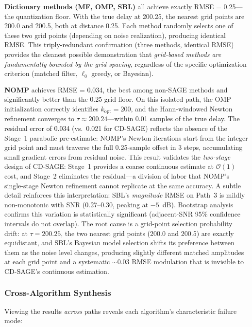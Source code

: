 \documentclass[journal]{IEEEtran}
\begin{document}
\textbf{Dictionary methods (MF, OMP, SBL)} all achieve exactly RMSE = 0.25---the quantization floor. With the true delay at 200.25, the nearest grid points are 200.0 and 200.5, both at distance 0.25. Each method randomly selects one of these two grid points (depending on noise realization), producing identical RMSE. This triply-redundant confirmation (three methods, identical RMSE) provides the cleanest possible demonstration that \textit{grid-based methods are fundamentally bounded by the grid spacing}, regardless of the specific optimization criterion (matched filter, $\ell_0$ greedy, or Bayesian).

\textbf{NOMP} achieves RMSE = 0.034, the best among non-SAGE methods and significantly better than the 0.25 grid floor. On this isolated path, the OMP initialization correctly identifies $k_{\text{opt}} = 200$, and the Hann-windowed Newton refinement converges to $\tau \approx 200.24$---within 0.01 samples of the true delay. The residual error of 0.034 (vs.\ 0.021 for CD-SAGE) reflects the absence of the Stage~1 parabolic pre-estimate: NOMP's Newton iterations start from the integer grid point and must traverse the full 0.25-sample offset in 3 steps, accumulating small gradient errors from residual noise. This result validates the \textit{two-stage} design of CD-SAGE: Stage~1 provides a coarse continuous estimate at $\mathcal{O}(1)$ cost, and Stage~2 eliminates the residual---a division of labor that NOMP's single-stage Newton refinement cannot replicate at the same accuracy. A subtle detail reinforces this interpretation: SBL's \textit{magnitude} RMSE on Path~3 is mildly non-monotonic with SNR (0.27--0.30, peaking at $-5$~dB). Bootstrap analysis confirms this variation is statistically significant (adjacent-SNR 95\% confidence intervals do not overlap). The root cause is a grid-point selection probability drift: at $\tau=200.25$, the two nearest grid points (200.0 and 200.5) are exactly equidistant, and SBL's Bayesian model selection shifts its preference between them as the noise level changes, producing slightly different matched amplitudes at each grid point and a systematic $\sim$0.03 RMSE modulation that is invisible to CD-SAGE's continuous estimation.

\subsubsection{Cross-Algorithm Synthesis}

Viewing the results \textit{across} paths reveals each algorithm's characteristic failure mode:
\end{document}
